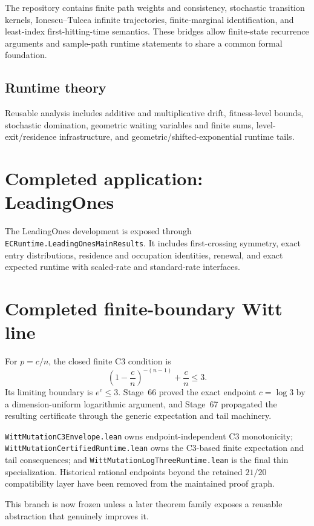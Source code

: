 \documentclass[11pt]{article}
\begin{document}
The repository contains finite path weights and consistency, stochastic transition
kernels, Ionescu--Tulcea infinite trajectories, finite-marginal identification, and
least-index first-hitting-time semantics. These bridges allow finite-state recurrence
arguments and sample-path runtime statements to share a common formal foundation.

\subsection{Runtime theory}

Reusable analysis includes additive and multiplicative drift, fitness-level bounds,
stochastic domination, geometric waiting variables and finite sums, level-exit/residence
infrastructure, and geometric/shifted-exponential runtime tails.

\section{Completed application: LeadingOnes}

The LeadingOnes development is exposed through
\texttt{ECRuntime.LeadingOnesMainResults}. It includes first-crossing symmetry, exact
entry distributions, residence and occupation identities, renewal, and exact expected
runtime with scaled-rate and standard-rate interfaces.

\section{Completed finite-boundary Witt line}

For $p=c/n$, the closed finite C3 condition is
\[
  \left(1-\frac cn\right)^{-(n-1)}+\frac cn\le3.
\]
Its limiting boundary is $e^c\le3$. Stage~66 proved the exact endpoint $c=\log3$ by a
dimension-uniform logarithmic argument, and Stage~67 propagated the resulting certificate
through the generic expectation and tail machinery.

\texttt{WittMutationC3Envelope.lean} owns endpoint-independent C3 monotonicity;
\texttt{WittMutationCertifiedRuntime.lean} owns the C3-based finite expectation and tail
consequences; and \texttt{WittMutationLogThreeRuntime.lean} is the final thin
specialization. Historical rational endpoints beyond the retained $21/20$ compatibility
layer have been removed from the maintained proof graph.

This branch is now frozen unless a later theorem family exposes a reusable abstraction
that genuinely improves it.
\end{document}
